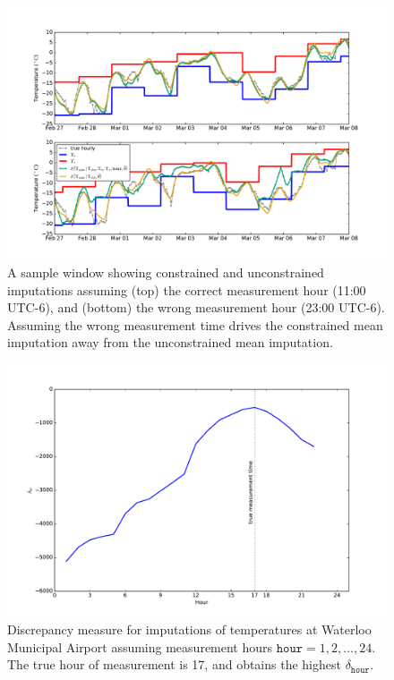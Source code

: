\documentclass[letter]{article}
\makeatletter
\def\maxwidth{\ifdim\Gin@nat@width>\linewidth\linewidth
\else\Gin@nat@width\fi}
\let\Oldincludegraphics\includegraphics
\renewcommand{\includegraphics}[1]{\Oldincludegraphics[width=0.98\maxwidth]{#1}}
\newcommand{\hour}{\mathtt{hour}}
\makeatother
\begin{document}
        \begin{figure}
\centering
\includegraphics{../figures/measure_hour_example.pdf}
\caption{\label{fig:measure_hour_example} A sample window showing constrained and unconstrained imputations assuming (top) the correct measurement hour (11:00 UTC-6), and (bottom) the wrong measurement hour (23:00 UTC-6). Assuming the wrong measurement time drives the constrained mean imputation away from the unconstrained mean imputation.}
\end{figure}
    


        \begin{figure}
\centering
\includegraphics{../figures/hr_inference.pdf}
\caption{\label{fig:hr_inference} Discrepancy measure for imputations of temperatures at Waterloo Municipal Airport assuming measurement hours \(\hour=1,2,\ldots,24\). The true hour of measurement is 17, and obtains the highest \(\delta_\hour\).}
\end{figure}
    
\end{document}
